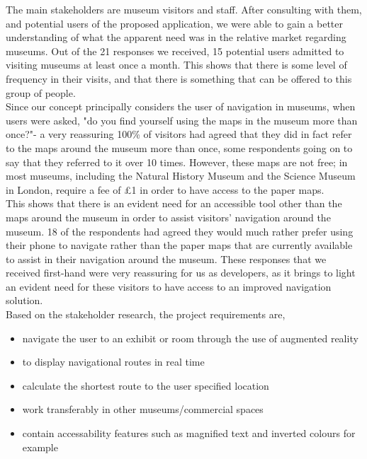 
The main stakeholders are museum visitors and staff. After consulting with them, and potential users of the proposed application, we were able to gain a better understanding of what the apparent need was in the relative market regarding museums. Out of the 21 responses we received, 15 potential users admitted to visiting museums at least once a month. This shows that there is some level of frequency in their visits, and that there is something that can be offered to this group of people.\\

Since our concept principally considers the user of navigation in museums, when users were asked, "do you find yourself using the maps in the museum more than once?"- a very reassuring 100\% of visitors had agreed that they did in fact refer to the maps around the museum more than once, some respondents going on to say that they referred to it over 10 times. However, these maps are not free; in most museums, including the Natural History Museum and the Science Museum in London, require a fee of £1 in order to have access to the paper maps.\\

This shows that there is an evident need for an accessible tool other than the maps around the museum in order to assist visitors' navigation around the museum. 18 of the respondents had agreed they would much rather prefer using their phone to navigate rather than the paper maps that are currently available to assist in their navigation around the museum. These responses that we received first-hand were very reassuring for us as developers, as it brings to light an evident need for these visitors to have access to an improved navigation solution.\\

Based on the stakeholder research, the project requirements are, 

\begin{itemize}
    \item navigate the user to an exhibit or room through the use of augmented reality
    \item to display navigational routes in real time
    \item calculate the shortest route to the user specified location 
    \item work transferably in other museums/commercial spaces
    \item contain accessability features such as magnified text and inverted colours for example
\end{itemize}
